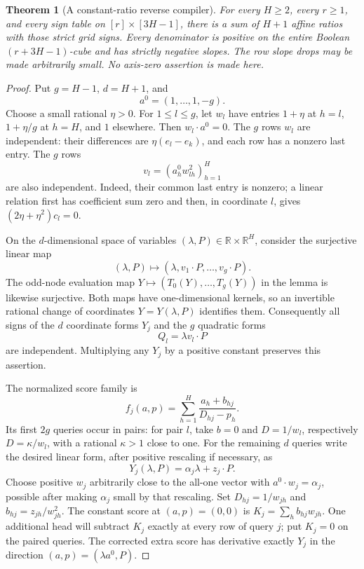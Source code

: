 \documentclass[11pt]{article}
\newtheorem{theorem}{Theorem}
\begin{document}
\begin{theorem}[A constant-ratio reverse compiler]
For every $H\geq2$, every $r\geq1$, and every sign table on
$[r]\times[3H-1]$, there is a sum of $H+1$ affine ratios with those
strict grid signs. Every denominator is positive on the entire Boolean
$(r+3H-1)$-cube and has strictly negative slopes. The row slope drops
may be made arbitrarily small. No axis-zero assertion is made here.
\end{theorem}
\begin{proof}
Put $g=H-1$, $d=H+1$, and
\[
 a^0=(1,\ldots,1,-g).
\]
Choose a small rational $\eta>0$. For $1\leq l\leq g$, let $w_l$ have
entries $1+\eta$ at $h=l$, $1+\eta/g$ at $h=H$, and $1$ elsewhere.
Then $w_l\cdot a^0=0$. The $g$ rows $w_l$ are independent: their
differences are $\eta(e_l-e_k)$, and each row has a nonzero last entry.
The $g$ rows
\[
 v_l=(a^0_h w_{lh}^2)_{h=1}^H
\]
are also independent. Indeed, their common last entry is nonzero; a
linear relation first has coefficient sum zero and then, in coordinate
$l$, gives $(2\eta+\eta^2)c_l=0$.

On the $d$-dimensional space of variables $(\lambda,P)\in
\mathbb R\times\mathbb R^H$, consider the surjective linear map
\[
 (\lambda,P)\longmapsto
 (\lambda,v_1\cdot P,\ldots,v_g\cdot P).
\]
The odd-node evaluation map $Y\mapsto(T_0(Y),\ldots,T_g(Y))$ in the
lemma is likewise surjective. Both maps have one-dimensional kernels,
so an invertible rational change of coordinates $Y=Y(\lambda,P)$
identifies them. Consequently all signs of the $d$ coordinate forms
$Y_j$ and the $g$ quadratic forms
\[
 Q_l=\lambda v_l\cdot P                                      \tag{2}
\]
are independent. Multiplying any $Y_j$ by a positive constant preserves
this assertion.

The normalized score family is
\[
 f_j(a,p)=\sum_{h=1}^H\frac{a_h+b_{hj}}{D_{hj}-p_h}.
 \tag{3}
\]
Its first $2g$ queries occur in pairs: for pair $l$, take $b=0$ and
$D=1/w_l$, respectively $D=\kappa/w_l$, with a rational $\kappa>1$
close to one. For the remaining $d$ queries write the desired linear
form, after positive rescaling if necessary, as
\[
 Y_j(\lambda,P)=\alpha_j\lambda+z_j\cdot P.
\]
Choose positive $w_j$ arbitrarily close to the all-one vector with
$a^0\cdot w_j=\alpha_j$, possible after making $\alpha_j$ small by
that rescaling. Set $D_{hj}=1/w_{jh}$ and
$b_{hj}=z_{jh}/w_{jh}^2$. The constant score at $(a,p)=(0,0)$ is
$K_j=\sum_h b_{hj}w_{jh}$. One additional head will subtract $K_j$
exactly at every row of query $j$; put $K_j=0$ on the paired queries.
The corrected extra score has derivative exactly $Y_j$ in the direction
$(a,p)=(\lambda a^0,P)$.


\end{proof}
\end{document}
